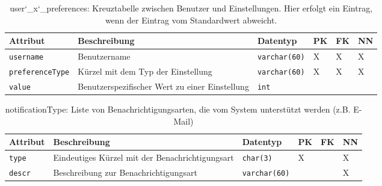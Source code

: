 \begin{table}[!ht]
	\caption{user\char`_x\char`_preferences: Kreuztabelle zwischen Benutzer und Einstellungen. Hier erfolgt ein Eintrag, wenn der Eintrag vom Standardwert abweicht.}
	\begin{tabular}{p{3cm}p{5cm}p{2cm}p{1cm}p{1cm}p{1cm}}
		\toprule 
		\textbf{Attribut} & \textbf{Beschreibung} & \textbf{Datentyp} & \textbf{PK} & \textbf{FK} & \textbf{NN} \\
		\hline 
		\texttt{username} & Benutzername & \texttt{varchar(60)} & X & X & X   \\
		\texttt{preferenceType} & Kürzel mit dem Typ der Einstellung & \texttt{varchar(60)} & X & X & X  \\
		\texttt{value} &  Benutzerspezifischer Wert zu einer Einstellung & \texttt{int} & & &   \\
		\bottomrule
	\end{tabular}
\end{table}

\begin{table}[!ht]
	\caption{notificationType: Liste von Benachrichtigungsarten, die vom System unterstützt werden (z.B. E-Mail)}
	\begin{tabular}{p{3cm}p{5cm}p{2cm}p{1cm}p{1cm}p{1cm}}
		\toprule 
		\textbf{Attribut} & \textbf{Beschreibung} & \textbf{Datentyp} & \textbf{PK} & \textbf{FK} & \textbf{NN} \\
		\hline 
		\texttt{type} & Eindeutiges Kürzel mit der Benachrichtigungsart & \texttt{char(3)} & X & & X   \\
		\texttt{descr} & Beschreibung zur Benachrichtigungsart & \texttt{varchar(60)} & & & X  \\
		\bottomrule
	\end{tabular}
\end{table}

